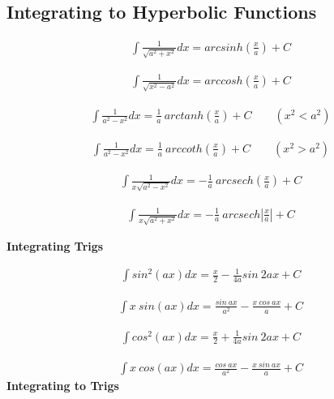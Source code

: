 \documentclass{article}
\begin{document}
\subsection{Integrating to Hyperbolic Functions}

\begin{align*}
    \int \frac{1}{\sqrt{a^2+x^2}} dx = arcsinh(\frac{x}{a}) + C
\end{align*}

\begin{align*}
    \int \frac{1}{\sqrt{x^2-a^2}} dx = arccosh(\frac{x}{a}) + C
\end{align*}

\begin{align*}
    \int \frac{1}{a^2-x^2} dx = \frac{1}{a} \ arctanh(\frac{x}{a}) + C \qquad (x^2<a^2)
\end{align*}

\begin{align*}
    \int \frac{1}{a^2-x^2} dx = \frac{1}{a} \ arccoth(\frac{x}{a}) + C \qquad (x^2>a^2)
\end{align*}

\begin{align*}
    \int \frac{1}{x\sqrt{a^2-x^2}} dx = -\frac{1}{a} \ arcsech(\frac{x}{a}) + C
\end{align*}

\begin{align*}
    \int \frac{1}{x\sqrt{a^2+x^2}} dx = -\frac{1}{a} \ arcsech|\frac{x}{a}| + C
\end{align*}
\newline

\textbf{Integrating Trigs}

\begin{align*}
    \int sin^2(ax) dx = \frac{x}{2} - \frac{1}{4a} sin \ 2ax + C
\end{align*}

\begin{align*}
    \int x \ sin(ax) dx = \frac{sin \ ax}{a^2} - \frac{x \ cos \ ax}{a}+ C
\end{align*}

\begin{align*}
    \int cos^2(ax) dx = \frac{x}{2} + \frac{1}{4a} sin \ 2ax + C
\end{align*}

\begin{align*}
    \int x \ cos(ax) dx = \frac{cos \ ax}{a^2} - \frac{x \ sin \ ax}{a}+ C
\end{align*}
\textbf{Integrating to Trigs}  
    
\end{document}
